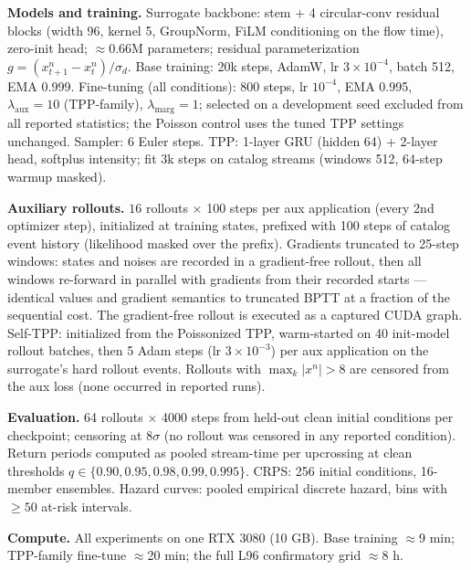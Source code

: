 \documentclass[11pt]{article}
\begin{document}
\textbf{Models and training.} Surrogate backbone: stem + 4 circular-conv
residual blocks (width 96, kernel 5, GroupNorm, FiLM conditioning on the
flow time), zero-init head; $\approx$0.66M parameters; residual
parameterization $g = (x_{t+1}^n - x_t^n)/\sigma_d$. Base training: 20k
steps, AdamW, lr $3\!\times\!10^{-4}$, batch 512, EMA 0.999. Fine-tuning
(all conditions): 800 steps, lr $10^{-4}$, EMA 0.995,
$\lambda_{\mathrm{aux}} = 10$ (TPP-family), $\lambda_{\mathrm{marg}} = 1$;
selected on a development seed excluded from all reported statistics; the
Poisson control uses the tuned TPP settings unchanged. Sampler: 6 Euler
steps. TPP: 1-layer GRU (hidden 64) + 2-layer head, softplus intensity;
fit 3k steps on catalog streams (windows 512, 64-step warmup masked).

\textbf{Auxiliary rollouts.} $16$ rollouts $\times$ 100 steps per aux
application (every 2nd optimizer step), initialized at training states,
prefixed with 100 steps of catalog event history (likelihood masked over
the prefix). Gradients truncated to 25-step windows: states and noises are
recorded in a gradient-free rollout, then all windows re-forward in
parallel with gradients from their recorded starts --- identical values
and gradient semantics to truncated BPTT at a fraction of the sequential
cost. The gradient-free rollout is executed as a captured CUDA graph.
Self-TPP: initialized from the Poissonized TPP, warm-started on 40
init-model rollout batches, then 5 Adam steps (lr $3\!\times\!10^{-3}$)
per aux application on the surrogate's hard rollout events. Rollouts with
$\max_k |x^n| > 8$ are censored from the aux loss (none occurred in
reported runs).

\textbf{Evaluation.} 64 rollouts $\times$ 4000 steps from held-out clean
initial conditions per checkpoint; censoring at $8\sigma$ (no rollout was
censored in any reported condition). Return periods computed as pooled
stream-time per upcrossing at clean thresholds $q \in \{0.90, 0.95, 0.98,
0.99, 0.995\}$. CRPS: 256 initial conditions, 16-member ensembles.
Hazard curves: pooled empirical discrete hazard, bins with $\ge 50$
at-risk intervals.

\textbf{Compute.} All experiments on one RTX 3080 (10 GB). Base training
$\approx$9 min; TPP-family fine-tune $\approx$20 min; the full L96
confirmatory grid $\approx$8 h.
\end{document}
